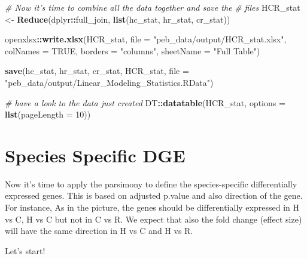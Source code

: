\documentclass[]{book}
\newenvironment{Shaded}{\begin{snugshade}}{\end{snugshade}}
\newcommand{\CommentTok}[1]{\textcolor[rgb]{0.56,0.35,0.01}{\textit{#1}}}
\newcommand{\DataTypeTok}[1]{\textcolor[rgb]{0.13,0.29,0.53}{#1}}
\newcommand{\DecValTok}[1]{\textcolor[rgb]{0.00,0.00,0.81}{#1}}
\newcommand{\KeywordTok}[1]{\textcolor[rgb]{0.13,0.29,0.53}{\textbf{#1}}}
\newcommand{\NormalTok}[1]{#1}
\newcommand{\OperatorTok}[1]{\textcolor[rgb]{0.81,0.36,0.00}{\textbf{#1}}}
\newcommand{\OtherTok}[1]{\textcolor[rgb]{0.56,0.35,0.01}{#1}}
\newcommand{\StringTok}[1]{\textcolor[rgb]{0.31,0.60,0.02}{#1}}
\begin{document}
\begin{Shaded}
\begin{Highlighting}[]

\CommentTok{# Now it's time to combine all the data together and save the}
\CommentTok{# files}
\NormalTok{HCR_stat <-}\StringTok{ }\KeywordTok{Reduce}\NormalTok{(dplyr}\OperatorTok{::}\NormalTok{full_join, }\KeywordTok{list}\NormalTok{(hc_stat, hr_stat, cr_stat))}

\NormalTok{openxlsx}\OperatorTok{::}\KeywordTok{write.xlsx}\NormalTok{(HCR_stat, }\DataTypeTok{file =} \StringTok{"peb_data/output/HCR_stat.xlsx"}\NormalTok{, }
  \DataTypeTok{colNames =} \OtherTok{TRUE}\NormalTok{, }\DataTypeTok{borders =} \StringTok{"columns"}\NormalTok{, }\DataTypeTok{sheetName =} \StringTok{"Full Table"}\NormalTok{)}

\KeywordTok{save}\NormalTok{(hc_stat, hr_stat, cr_stat, HCR_stat, }\DataTypeTok{file =} \StringTok{"peb_data/output/Linear_Modeling_Statistics.RData"}\NormalTok{)}

\CommentTok{# have a look to the data just created}
\NormalTok{DT}\OperatorTok{::}\KeywordTok{datatable}\NormalTok{(HCR_stat, }\DataTypeTok{options =} \KeywordTok{list}\NormalTok{(}\DataTypeTok{pageLength =} \DecValTok{10}\NormalTok{))}
\end{Highlighting}
\end{Shaded}

\hypertarget{htmlwidget-52d82635d988c6e12f4c}{}

\hypertarget{species-specific-dge}{%
\section{Species Specific DGE}\label{species-specific-dge}}

Now it's time to apply the parsimony to define the species-specific differentially expressed genes. This is based on adjusted p.value and also direction of the gene.
For instance, As in the picture, the genes should be differentially expressed in H vs C, H vs C but not in C vs R. We expect that also the fold change (effect size) will have the same direction in H vs C and H vs R.

Let's start!
\end{document}
